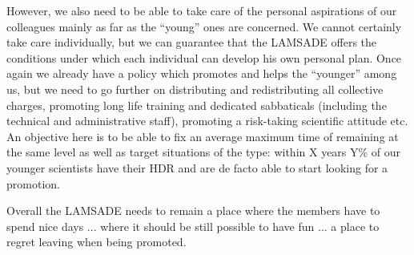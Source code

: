 \begin{enumerate}
      However, we also need to be able to take care of the personal aspirations of our colleagues mainly as far as the ``young'' ones are concerned. We cannot certainly take care individually, but we can guarantee that the LAMSADE offers the conditions under which each individual can develop his own personal plan.  Once again we already have a policy which promotes and helps the ``younger'' among us, but we need to go further on distributing and redistributing all collective charges, promoting long life training and dedicated sabbaticals (including the technical and administrative staff), promoting a risk-taking scientific attitude etc. An objective here is to be able to fix an average maximum time of remaining at the same level as well as target situations of the type: within X years Y\% of our younger scientists have their HDR and are de facto able to start looking for a promotion.

      Overall the LAMSADE needs to remain a place where the members have to spend nice days ... where it should be still possible to have fun ... a place to regret leaving when being promoted.
\end{enumerate}
